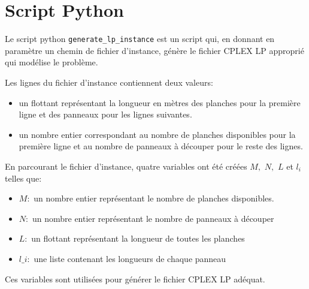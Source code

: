\documentclass{article}[A4]
\begin{document}
\section{Script Python}
Le script python \texttt{generate\_lp\_instance} est un script qui, 
en donnant en paramètre un chemin de fichier d'instance, génère le 
fichier CPLEX LP approprié qui modélise le problème.

Les lignes du fichier d'instance contiennent deux valeurs:
\begin{itemize}
	\item un flottant représentant la longueur en mètres des planches 
	pour la première ligne et des panneaux pour les lignes suivantes.
	\item un nombre entier correspondant au nombre de planches 
	disponibles pour la première ligne et au nombre de panneaux à 
	découper pour le reste des lignes.
\end{itemize}

En parcourant le fichier d'instance, quatre variables ont été créées $M,$
 $N,$ $L$ et $l_i$ telles que:
\begin{itemize}
	\item[] $M:$ un nombre entier représentant le nombre de planches
	disponibles.
	\item[] $N:$ un nombre entier représentant le nombre de panneaux à 
	découper
	\item[] $L:$ un flottant représentant la longueur de toutes les 
	planches 
	\item[] \texttt{$l\_i:$} une liste contenant les longueurs de chaque panneau
\end{itemize} 

Ces variables sont utilisées pour générer le fichier CPLEX LP adéquat. 
\end{document}
